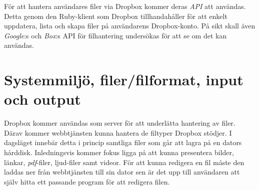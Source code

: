 \documentclass[a4paper,12pt,oneside,final]{extbook}
\begin{document}
För att hantera användares filer via Dropbox kommer deras \emph{API} att användas.
Detta genom den Ruby-klient som Dropbox tillhandahåller för att enkelt uppdatera,
lista och skapa filer på användarens Dropbox-konto. På sikt skall även \emph{Google}:s
och \emph{Box}:s API för filhantering undersökas för att se om det kan användas.

\section{Systemmiljö, filer/filformat, input och output}
Dropbox kommer användas som server för att underlätta hantering av filer. Därav
kommer webbtjänsten kunna hantera de filtyper Dropbox stödjer. I dagsläget innebär
detta i princip samtliga filer som går att lagra på en dators hårddisk.
Inledningsvis kommer fokus ligga på att kunna presentera bilder, länkar, \emph{pdf}-filer,
ljud-filer samt videor. För att kunna redigera en fil måste den laddas ner från
webbtjänsten till sin dator sen är det upp till användaren att själv hitta ett
passande program för att redigera filen.
\end{document}
